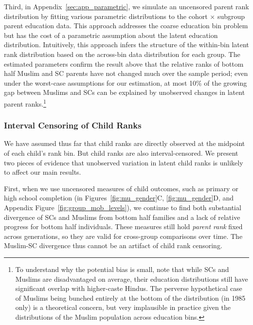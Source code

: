 \documentclass[12pt,letterpaper]{article}
\numberwithin{equation}{section}
\begin{document}
Third, in Appendix~\ref{sec:app_parametric}, we simulate an uncensored parent rank distribution by fitting various parametric distributions to the cohort $\times$ subgroup parent education data. This approach addresses the coarse education bin problem but has the cost of a parametric assumption about the latent education distribution. Intuitively, this approach infers the structure of the within-bin latent rank distribution based on the across-bin data distribution for each group. The estimated parameters confirm the result above that the relative ranks of bottom half Muslim and SC parents have not changed much over the sample period; even under the worst-case assumptions for our estimation, at most 10\% of the growing gap between Muslims and SCs can be explained by unobserved changes in latent parent ranks.\footnote{To understand why the potential bias is small, note that while SCs and Muslims are disadvantaged on average, their education distributions still have significant overlap with higher-caste Hindus. The perverse hypothetical case of Muslims being bunched entirely at the bottom of the distribution (in 1985 only) is a theoretical concern, but very implausible in practice given the distributions of the Muslim population across education bins.}

\subsubsection{Interval Censoring of Child Ranks}
\label{sec:childcens}

We have assumed thus far that child ranks are directly observed at the midpoint of each child's rank bin. But child ranks are also interval-censored. We present two pieces of evidence that unobserved variation in latent child ranks is unlikely to affect our main results.

First, when we use uncensored measures of child outcomes, such as primary or high school completion (in Figures~\ref{fig:mu_gender}C, \ref{fig:mu_gender}D, and Appendix Figure~\ref{fig:group_mob_levels}), we continue to find both substantial divergence of SCs and Muslims from bottom half families and a lack of relative progress for bottom half individuals. These measures still hold \textit{parent rank} fixed across generations, so they are valid for cross-group comparisons over time. The Muslim-SC divergence thus cannot be an artifact of child rank censoring.
\end{document}
